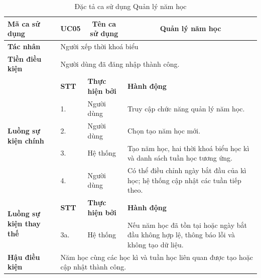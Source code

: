 \documentclass[../DoAn.tex]{subfiles}
\begin{document}
\begin{longtable}{|p{2.8cm}|p{1cm}|p{2.8cm}|p{6.3cm}|}
\caption{Đặc tả ca sử dụng Quản lý năm học}
\label{tab:app_uc_quan_ly_nam_hoc} \\
\hline
\multicolumn{1}{|l|}{\textbf{Mã ca sử dụng}} & \multicolumn{1}{c|}{UC05} &
\multicolumn{1}{c|}{\textbf{Tên ca sử dụng}} & \multicolumn{1}{c|}{Quản lý năm học} \\
\hline
\multicolumn{1}{|l|}{\textbf{Tác nhân}} & \multicolumn{3}{l|}{Người xếp thời khoá biểu} \\
\hline
\multicolumn{1}{|l|}{\textbf{Tiền điều kiện}} & \multicolumn{3}{l|}{Người dùng đã đăng nhập thành công.} \\
\hline
\multirow{5}{2.8cm}{\textbf{Luồng sự kiện chính}} & \textbf{STT} & \textbf{Thực hiện bởi} & \textbf{Hành động} \\
\cline{2-4}
& 1. & Người dùng & Truy cập chức năng quản lý năm học. \\
\cline{2-4}
& 2. & Người dùng & Chọn tạo năm học mới. \\
\cline{2-4}
& 3. & Hệ thống & Tạo năm học, hai thời khoá biểu học kì và danh sách tuần học tương ứng. \\
\cline{2-4}
& 4. & Người dùng & Có thể điều chỉnh ngày bắt đầu của kì học; hệ thống cập nhật các tuần tiếp theo. \\
\hline
\multirow{2}{2.8cm}{\textbf{Luồng sự kiện thay thế}} & \textbf{STT} & \textbf{Thực hiện bởi} & \textbf{Hành động} \\
\cline{2-4}
& 3a. & Hệ thống & Nếu năm học đã tồn tại hoặc ngày bắt đầu không hợp lệ, thông báo lỗi và không tạo dữ liệu. \\
\hline
\multicolumn{1}{|l|}{\textbf{Hậu điều kiện}} & \multicolumn{3}{p{10.5cm}|}{Năm học cùng các học kì và tuần học liên quan được tạo hoặc cập nhật thành công.} \\
\hline
\end{longtable}
\end{document}
